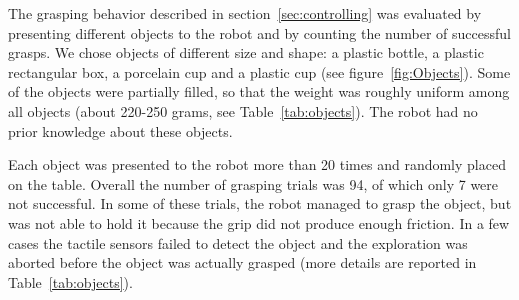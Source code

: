 

The grasping behavior described in section~\ref{sec:controlling}
was evaluated by presenting different objects to the robot and by
counting the number of successful grasps. We chose objects of
different size and shape: a plastic bottle, a plastic rectangular
box, a porcelain cup and a plastic cup (see
figure~\ref{fig:Objects}). Some of the objects were partially
filled, so that the weight was roughly uniform among all objects
(about 220-250 grams, see Table~\ref{tab:objects}). The robot had 
no prior knowledge about these objects.

Each object was presented to the robot more than 20 times and
randomly placed on the table. Overall the number of grasping
trials was 94, of which only 7 were not successful. In some of
these trials, the robot managed to grasp the object, but was not
able to hold it because the grip did not produce enough friction.
In a few cases the tactile sensors failed to detect the object and
the exploration was aborted before the object was actually
grasped (more details are reported in Table~\ref{tab:objects}).

